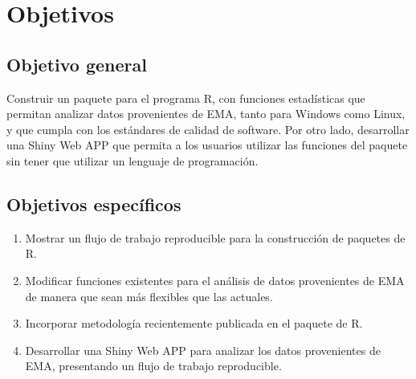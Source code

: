 \chapter{Objetivos}
\section{Objetivo general}

Construir un paquete para el programa R, con funciones estadísticas que permitan analizar datos provenientes de EMA, tanto para Windows como Linux, y que cumpla con los estándares de calidad de software. Por otro lado, desarrollar una Shiny Web APP que permita a los usuarios utilizar las funciones del paquete sin tener que utilizar un lenguaje de programación.


\section{Objetivos específicos}
\begin{enumerate}
\item Mostrar un flujo de trabajo reproducible para la construcción de paquetes de R.
\item Modificar funciones existentes para el análisis de datos provenientes de EMA de manera que sean más flexibles que las actuales.
\item Incorporar metodología recientemente publicada en el paquete de R.
\item Desarrollar una Shiny Web APP para analizar los datos provenientes de EMA, presentando un flujo de trabajo reproducible.
\end{enumerate}

